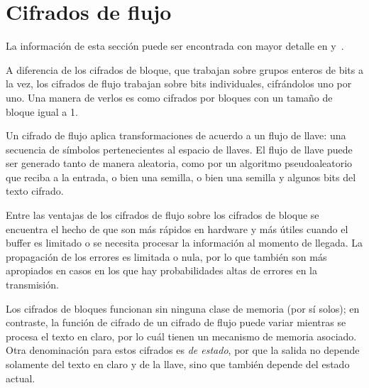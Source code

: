 %
%

\section{Cifrados de flujo}
\label{sec:flujo}

La información de esta sección puede ser encontrada con mayor detalle en
\cite{menezes, stallings} y~\cite{alan_konheim}.

A diferencia de los cifrados de bloque, que trabajan sobre grupos enteros de
bits a la vez, los cifrados de flujo trabajan sobre bits individuales,
cifrándolos uno por uno. Una manera de verlos es como cifrados por bloques con
un tamaño de bloque igual a 1.

Un cifrado de flujo aplica transformaciones de acuerdo a un flujo de llave:
una secuencia de símbolos pertenecientes al espacio de llaves. El flujo de
llave puede ser generado tanto de manera aleatoria, como por un algoritmo
pseudoaleatorio que reciba a la entrada, o bien una semilla, o bien una
semilla y algunos bits del texto cifrado.

Entre las ventajas de los cifrados de flujo sobre los cifrados de bloque se
encuentra el hecho de que son más rápidos en hardware y más útiles cuando
el buffer es limitado o se necesita procesar la información al momento de
llegada. La propagación de los errores es limitada o nula, por lo que también
son más apropiados en casos en los que hay probabilidades altas de errores en
la transmisión.

Los cifrados de bloques funcionan sin ninguna clase de memoria (por sí solos);
en contraste, la función de cifrado de un cifrado de flujo puede variar
mientras se procesa el texto en claro, por lo cuál tienen un mecanismo de
memoria asociado. Otra denominación para estos cifrados es \textit{de estado},
por que la salida no depende solamente del texto en claro y de la llave, sino
que también depende del estado actual.

